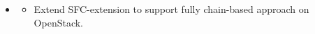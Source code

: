 \begin{itemize}[ $\leftarrow$ we keep the sketch of the storyline currently here only to have a overall view for the draft. This part will be deleted later on]
\item \begin{itemize}[Future Work]
    \item Extend SFC-extension to support fully chain-based approach on OpenStack.
\end{itemize}



    \end{itemize}
